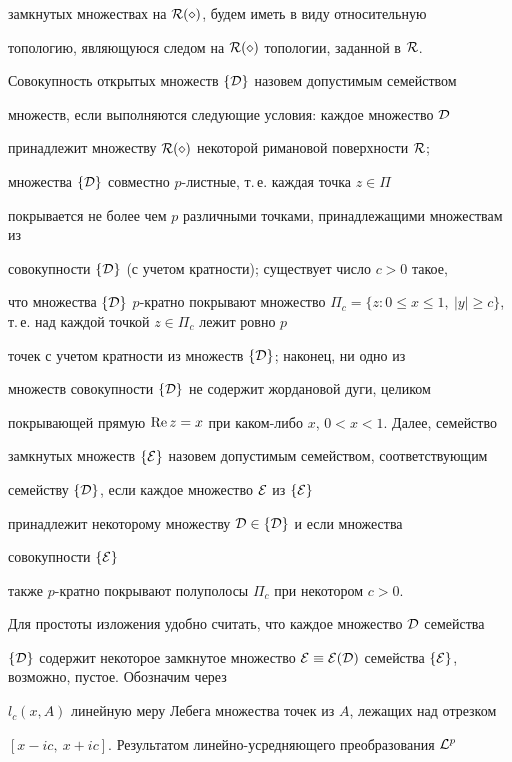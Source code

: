 замкнутых множествах на $\cal R(\Pi)$, будем иметь в виду относительную


топологию, являющуюся следом на $\cal R(\Pi)$ топологии, заданной в $\cal R$.


Совокупность открытых множеств $\{\cal D\}$ назовем допустимым семейством


множеств, если выполняются следующие условия: каждое множество ${\cal D}$


принадлежит множеству $\cal R(\Pi)$ некоторой римановой поверхности $\cal R$;


множества $\{\cal D\}$ совместно $p$-листные, т.\,е. каждая точка $z\in\Pi$


покрывается не более чем $p$ различными точками, принадлежащими множествам из


совокупности $\{{\cal D}\}$ (с учетом кратности); существует число $c>0$ такое,


что множества $\{\cal D\}$\; $p$-кратно покрывают множество $\Pi_c=\{z: 0\le


x\leq 1,\ |y|\geq c\}$, т.\,е. над каждой точкой $z\in\Pi_c$ лежит ровно $p$


точек с учетом кратности из множеств $\{{\cal D}\}$; наконец, ни одно из


множеств совокупности $\{{\cal D}\}$ не содержит жордановой дуги, целиком


покрывающей прямую $\operatorname{Re} z=x$ при каком-либо $x$, $0<x<1$. Далее, семейство


замкнутых множеств $\{\cal E\}$ назовем допустимым семейством, соответствующим


семейству $\{{\cal D}\}$, если каждое множество ${\cal E}$ из $\{{\cal E}\}$


принадлежит некоторому множеству $\cal D \in \{\cal D\}$ и если множества


совокупности $\{\cal E\}$


также $p$-кратно покрывают полуполосы $\Pi_c$ при некотором $c>0$.


Для простоты изложения удобно считать, что каждое множество $\cal D$ семейства


$\{{\cal D}\}$ содержит некоторое замкнутое множество ${\cal E} \equiv \cal


E({\cal D})$ семейства $\{{\cal E}\}$, возможно, пустое. Обозначим через


$l_c(x,A)$ линейную меру Лебега множества точек из $A$, лежащих над отрезком


$[x-ic,\ x+ic]$. Результатом линейно-усредняющего преобразования ${\cal L}^p$


